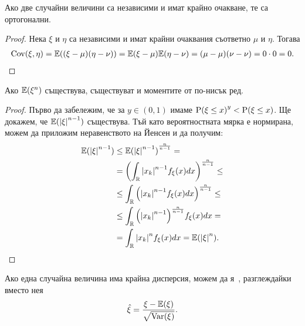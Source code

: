 \documentclass[numbers=endperiod, bibliography=totocnumbered]{scrartcl}
\begin{document}
\begin{proposition}\label{thm:orthogonal-if-independent}
  Ако две случайни величини са независими и имат крайно очакване, те са ортогонални.
\end{proposition}
\begin{proof}
  Нека \( \xi \) и \( \eta \) са независими и имат крайни очаквания съответно \( \mu \) и \( \eta \). Тогава
  \begin{align*}
    \operatorname{Cov}(\xi, \eta)
    =
    \mathbb{E}((\xi - \mu) (\eta - \nu))
    =
    \mathbb{E}(\xi - \mu) \mathbb{E}(\eta - \nu)
    =
    (\mu - \mu) (\nu - \nu)
    =
    0 \cdot 0
    =
    0.
  \end{align*}
\end{proof}

\begin{proposition}\label{thm:lower-order-moments}
  Ако \( \mathbb{E}(\xi^n) \) съществува, съществуват и моментите от по-нисък ред.
\end{proposition}
\begin{proof}
  Първо да забележим, че за \( y \in (0, 1) \) имаме \( {\operatorname{P}(\xi \leq x)}^y < \operatorname{P}(\xi \leq x) \). Ще докажем, че \( \mathbb{E}({\left\vert \xi \right\vert}^{n-1}) \) съществува. Тъй като вероятностната мярка е нормирана, можем да приложим неравенството на Йенсен и да получим:
  \begin{align*}
    \mathbb{E}({\left\vert \xi \right\vert}^{n-1})
    &\leq
    {\mathbb{E}({\left\vert \xi \right\vert}^{n-1})}^{\frac n {n-1}}
    = \\ &=
    {\left( \int_{\mathbb{R}} {\left\vert x_k \right\vert}^{n-1} f_\xi(x) dx \right)}^{\frac n {n-1}}
    \leq \\ &\leq
    \int_{\mathbb{R}} {\left({\left\vert x_k \right\vert}^{n-1} f_\xi(x) dx \right)}^{\frac n {n-1}}
    \leq \\ &\leq
    \int_{\mathbb{R}} {\left({\left\vert x_k \right\vert}^{n-1} \right)}^{\frac n {n-1}} f_\xi(x) dx
    = \\ &=
    \int_{\mathbb{R}} {\left\vert x_k \right\vert}^n f_\xi(x) dx
    =
    \mathbb{E}({\left\vert \xi \right\vert}^n).
  \end{align*}
\end{proof}

\begin{definition}
  Ако една случайна величина има крайна дисперсия, можем да я~, разглеждайки вместо нея
  \begin{align*}
    \hat \xi = \frac {\xi - \mathbb{E}(\xi)} {\sqrt{\operatorname{Var}(\xi)}}.
  \end{align*}
\end{definition}
\end{document}
